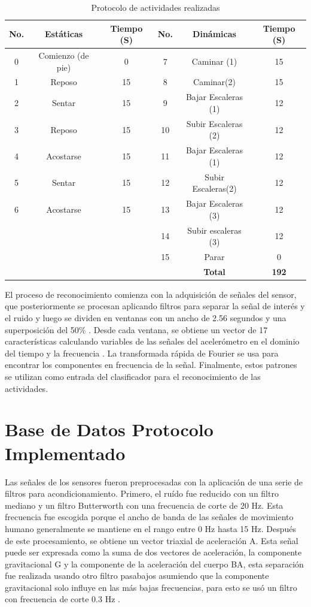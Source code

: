 \documentclass[11pt]{report}
\begin{document}
\begin{table}[h!]
\begin{center}
\begin{tabular}{ |c|c|c|c|c|c| } 
\hline
\textbf{No.} & \textbf{Estáticas} & \textbf{Tiempo (S)} & \textbf{No.} & \textbf{Dinámicas} & \textbf{Tiempo (S)} \\
\hline
0 & Comienzo (de pie) & 0 & 7 & Caminar (1) & 15 \\ 
1&  Reposo & 15 & 8 & Caminar(2) & 15\\ 
2&  Sentar & 15 & 9 & Bajar Escaleras (1) & 12\\ 
3&  Reposo & 15 & 10 & Subir Escaleras (2) & 12\\ 
4&  Acostarse & 15 & 11 & Bajar Escaleras (1) & 12\\ 
5&  Sentar & 15 & 12 & Subir Escaleras(2) & 12\\ 
6&  Acostarse & 15 & 13 & Bajar Escaleras (3) & 12\\ 
&   &  & 14 & Subir escaleras (3) & 12\\
&   &  & 15 & Parar & 0\\ 
\hline
\hline
&   &  &  & \textbf{Total} & \textbf{192}\\ 
\hline
\end{tabular}
\caption{Protocolo de actividades realizadas \cite{Anguita}}
\end{center}
\end{table}

\par
\medskip
\noindent
El proceso de reconocimiento comienza con la adquisición de señales del sensor, que posteriormente se procesan aplicando filtros para separar la señal de interés y el ruido y luego se dividen en ventanas con un ancho de 2.56 segundos y una superposición del 50\% \cite{Angarita}. Desde cada ventana, se obtiene un vector de 17 características calculando variables de las señales del acelerómetro en el dominio del tiempo y la frecuencia \cite{Angarita}. La transformada rápida de Fourier se usa para encontrar los componentes en frecuencia de la señal. Finalmente, estos patrones se utilizan como entrada del clasificador para el reconocimiento de las actividades.


\section{Base de Datos Protocolo Implementado}

Las señales de los sensores fueron preprocesadas con la aplicación de una serie de filtros para acondicionamiento. Primero, el ruído fue reducido con un filtro mediano y un filtro Butterworth con una frecuencia de corte de 20 Hz. Esta frecuencia fue escogida porque el ancho de banda de las señales de movimiento humano generalmente se mantiene en el rango entre 0 Hz hasta 15 Hz. Después de este procesamiento, se obtiene un vector triaxial de aceleración A. Esta señal puede ser expresada como la suma de dos vectores de aceleración, la componente gravitacional G y la componente de la aceleración del cuerpo BA, esta separación fue realizada usando otro filtro pasabajos asumiendo que la componente gravitacional solo influye en las más bajas frecuencias, para esto se usó un filtro con frecuencia de corte 0.3 Hz \cite{Anguita}.
\end{document}

